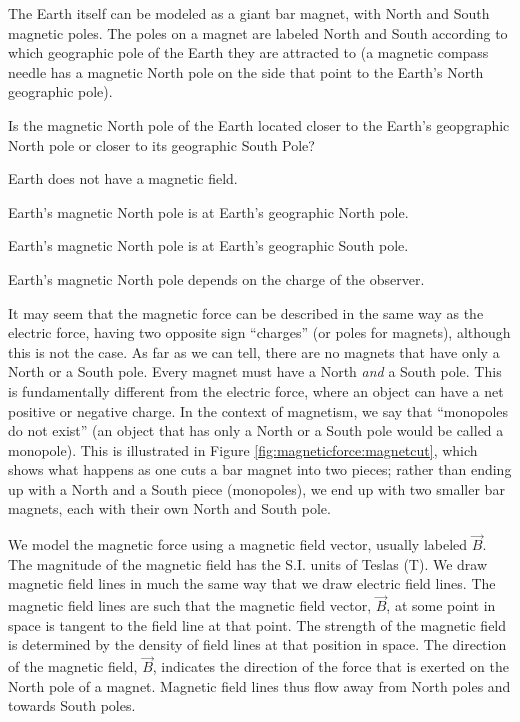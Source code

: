 The Earth itself can be modeled as a giant bar magnet, with North and South magnetic poles. The poles on a magnet are labeled North and South according to which geographic pole of the Earth they are attracted to (a magnetic compass needle has a magnetic North pole on the side that point to the Earth's North geographic pole).
\begin{checkpoint}{}
	\begin{MCquestion}{Is the magnetic North pole of the Earth located closer to the Earth's geopgraphic North pole or closer to its geographic South Pole?}
		\item Earth does not have a magnetic field.
		\item Earth's magnetic North pole is at Earth's geographic North pole.
		\item Earth's magnetic North pole is at Earth's geographic South pole. \correct
		\item Earth's magnetic North pole depends on the charge of the observer.
	\end{MCquestion}
\end{checkpoint}

It may seem that the magnetic force can be described in the same way as the electric force, having two opposite sign ``charges'' (or poles for magnets), although this is not the case. As far as we can tell, there are no magnets that have only a North or a South pole. Every magnet must have a North \textit{and} a South pole. This is fundamentally different from the electric force, where an object can have a net positive or negative charge. In the context of magnetism, we say that ``monopoles do not exist'' (an object that has only a North or a South pole would be called a monopole). This is illustrated in Figure \ref{fig:magneticforce:magnetcut}, which shows what happens as one cuts a bar magnet into two pieces; rather than ending up with a North and a South piece (monopoles), we end up with two smaller bar magnets, each with their own North and South pole.


We model the magnetic force using a magnetic field vector, usually labeled $\vec B$. The magnitude of the magnetic field has the S.I. units of Teslas (\si{T}). We draw magnetic field lines in much the same way that we draw electric field lines. The magnetic field lines are such that the magnetic field vector, $\vec B$, at some point in space is tangent to the field line at that point. The strength of the magnetic field is determined by the density of field lines at that position in space. The direction of the magnetic field, $\vec B$, indicates the direction of the force that is exerted on the North pole of a magnet. Magnetic field lines thus flow away from North poles and towards South poles. 

